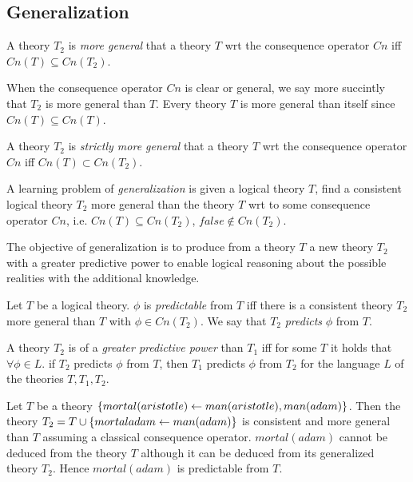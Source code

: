 \subsection{Generalization}

\begin{defn}
A theory $T_2$ is \emph{more general} that a theory $T$ wrt the consequence operator $Cn$ iff $Cn(T) \subseteq Cn(T_2)$.
\end{defn}
When the consequence operator $Cn$ is clear or general, we say more succintly that $T_2$ is more general than $T$. Every theory $T$ is more general than itself since $Cn(T) \subseteq Cn(T)$.

\begin{defn}
A theory $T_2$ is \emph{strictly more general} that a theory $T$ wrt the consequence operator $Cn$ iff $Cn(T) \subset Cn(T_2)$.
\end{defn}

\begin{defn}
A learning problem of \emph{generalization} is given a logical theory $T$, find a consistent logical theory $T_2$ more general than the theory $T$ wrt to some consequence operator $Cn$, i.e.
$Cn(T) \subseteq Cn(T_2)$, $false \not\in Cn(T_2)$.
\end{defn}

The objective of generalization is to produce from a theory $T$ a new theory $T_2$ with a greater predictive power to enable logical reasoning about the possible realities with the additional knowledge.

\begin{defn}
Let $T$ be a logical theory. $\phi$ is \emph{predictable} from $T$ iff there is a consistent theory $T_2$ more general than $T$ with $\phi \in Cn(T_2)$. We say that $T_2$ \emph{predicts} $\phi$ from $T$.
\end{defn}

\begin{defn}
A theory $T_2$ is of a \emph{greater predictive power} than $T_1$ iff
for some $T$ it holds that $\forall \phi \in L.$ if $T_2$ predicts $\phi$ from $T$, then $T_1$ predicts $\phi$ from $T_2$ for the language $L$ of the theories $T, T_1, T_2$.
\end{defn}

\begin{exmp}
Let $T$ be a theory $\{mortal(aristotle) \leftarrow man(aristotle), man(adam)\}$. Then the theory $T_2=T \cup \{mortal{adam} \leftarrow man(adam)\}$ is consistent and more general than $T$ assuming a classical consequence operator. $mortal(adam)$ cannot be deduced from the theory $T$ although it can be deduced from its generalized theory $T_2$. Hence $mortal(adam)$ is predictable from $T$.
\end{exmp}

